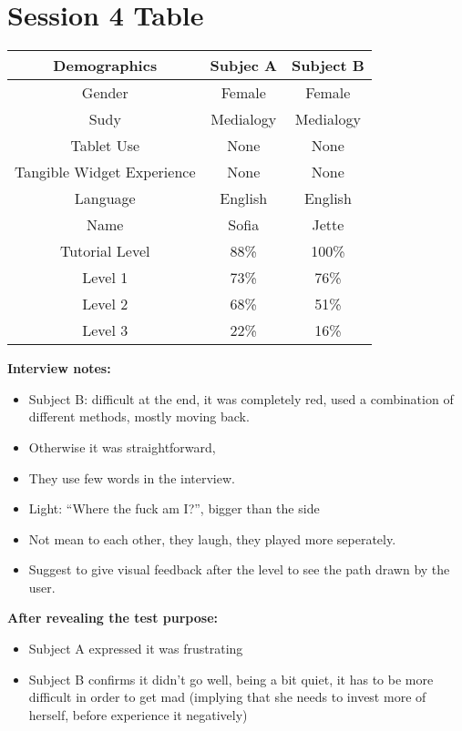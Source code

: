 \section*{Session 4 Table}
\begin{tabular}{|c|c|c|}
\hline 
\textbf{Demographics} & Subjec A & Subject B \\ 
\hline 
Gender & Female  & Female \\ 
\hline 
Sudy & Medialogy  & Medialogy \\ 
\hline 
Tablet Use & None & None \\ 
\hline 
Tangible Widget Experience & None & None  \\ 
\hline 
Language & English & English\\ 
\hline 
Name & Sofia & Jette\\ 
\hline \hline
Tutorial Level & 88\% & 100\% \\ 
\hline 
Level 1 & 73\% & 76\% \\ 
\hline 
Level 2 & 68\% & 51\% \\ 
\hline 
Level 3 & 22\% & 16\% \\ 
\hline 
\end{tabular} 

\textbf{Interview notes: }
\begin{itemize}
\item Subject B: difficult at the end, it was completely red, used a combination of different methods, mostly moving back.
\item Otherwise it was straightforward, 
\item They use few words in the interview.
\item Light: “Where the fuck am I?”, bigger than the side
\item Not mean to each other, they laugh, they played more seperately. 
\item Suggest to give visual feedback after the level to see the path drawn by the user.
\end{itemize}

\textbf{After revealing the test purpose:}
\begin{itemize}
\item Subject A expressed it was frustrating
\item Subject B confirms it didn’t go well, being a bit quiet, it has to be more difficult in order to get mad (implying that she needs to invest more of herself, before experience it negatively)
\end{itemize}

